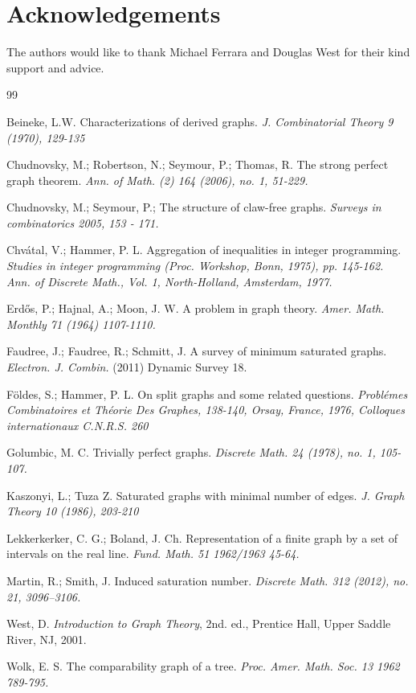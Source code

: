 \documentclass[12pt]{amsart}
\theoremstyle{plain}
\theoremstyle{definition}
\theoremstyle{remark}
\begin{document}
\section{Acknowledgements}
The authors would like to thank Michael Ferrara and Douglas West for their kind support and advice. %

\begin{thebibliography}{99}

Beineke, L.W.
 Characterizations of derived graphs.
 \emph{J. Combinatorial Theory 9 (1970), 129-135}

Chudnovsky, M.; Robertson, N.;
Seymour, P.; Thomas, R.
 The strong perfect graph theorem.
\emph{Ann. of Math. (2) 164 (2006), no. 1, 51-229.}

Chudnovsky, M.; Seymour, P.;
The structure of claw-free graphs.
\emph{Surveys in combinatorics 2005, 153 - 171.}

Chv\'atal, V.; Hammer, P. L. Aggregation of inequalities in integer programming.
\emph{Studies in integer programming (Proc. Workshop, Bonn, 1975), pp. 145-162. Ann. of Discrete Math., Vol. 1, North-Holland, Amsterdam, 1977.}

Erd\H{o}s, P.; Hajnal, A.; Moon, J. W.
A problem in graph theory.
\emph{Amer. Math. Monthly 71 (1964) 1107-1110. }

Faudree, J.; Faudree, R.; Schmitt, J. A survey of minimum saturated graphs. {\it Electron. J. Combin.} (2011) Dynamic Survey 18.

F\"oldes, S.; Hammer, P. L. On split graphs and some related questions.
\emph{Probl\'emes Combinatoires et Th\'eorie Des Graphes, 138-140, Orsay, France,
1976, Colloques internationaux C.N.R.S. 260}

Golumbic, M. C.
Trivially perfect graphs.
\emph{Discrete Math. 24 (1978), no. 1, 105-107.}

Kaszonyi, L.; Tuza Z. Saturated graphs with minimal number of edges.
\emph{J. Graph Theory 10 (1986), 203-210}

Lekkerkerker, C. G.; Boland, J. Ch.
Representation of a finite graph by a set of intervals on the real line.
\emph{Fund. Math. 51 1962/1963 45-64.}

Martin, R.; Smith, J. Induced saturation number.
\emph{Discrete Math. 312 (2012), no. 21, 3096--3106.}

West, D. {\it Introduction to Graph Theory}, 2nd. ed., Prentice Hall, Upper Saddle River, NJ, 2001.

Wolk, E. S.
The comparability graph of a tree.
\emph{Proc. Amer. Math. Soc. 13 1962 789-795. }

\end{thebibliography}
\end{document}
